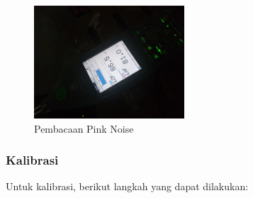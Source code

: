\documentclass{article}
\begin{document}
\begin{itemize}
		\begin{figure}[H]
			\centering
			\includegraphics[width=0.5\textwidth,angle=0]{images/ears_slm_pinknoise}
			\caption{Pembacaan Pink Noise}
		\end{figure}

	\end{itemize}

	\subsubsection{Kalibrasi}

	Untuk kalibrasi, berikut langkah yang dapat dilakukan:
\end{document}
